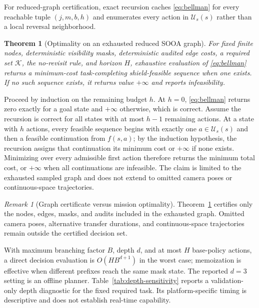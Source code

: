 \documentclass{IEEEtaes}
\newtheorem{theorem}{Theorem}
\theoremstyle{remark}
\newtheorem{remark}{Remark}
\theoremstyle{plain}
\begin{document}
For reduced-graph certification, exact recursion caches \eqref{eq:bellman} for every reachable tuple $(j,m,b,h)$ and enumerates every action in $\mathcal U_s(s)$ rather than a local reversal neighborhood.

\begin{theorem}[Optimality on an exhausted reduced SOOA graph]
\label{thm:reduced-optimality}
For fixed finite nodes, deterministic visibility masks, deterministic audited edge costs, a required set $\mathcal K$, the no-revisit rule, and horizon $H$, exhaustive evaluation of \eqref{eq:bellman} returns a minimum-cost task-completing shield-feasible sequence when one exists. If no such sequence exists, it returns value $+\infty$ and reports infeasibility.
\end{theorem}

\begin{IEEEproof}
Proceed by induction on the remaining budget $h$. At $h=0$, \eqref{eq:bellman} returns zero exactly for a goal state and $+\infty$ otherwise, which is correct. Assume the recursion is correct for all states with at most $h-1$ remaining actions. At a state with $h$ actions, every feasible sequence begins with exactly one $a\in\mathcal U_s(s)$ and then a feasible continuation from $f(s,a)$; by the induction hypothesis, the recursion assigns that continuation its minimum cost or $+\infty$ if none exists. Minimizing over every admissible first action therefore returns the minimum total cost, or $+\infty$ when all continuations are infeasible. The claim is limited to the exhausted sampled graph and does not extend to omitted camera poses or continuous-space trajectories.
\end{IEEEproof}

\begin{remark}[Graph certificate versus mission optimality]
Theorem~\ref{thm:reduced-optimality} certifies only the nodes, edges, masks, and audits included in the exhausted graph. Omitted camera poses, alternative transfer durations, and continuous-space trajectories remain outside the certified decision set.
\end{remark}

With maximum branching factor $B$, depth $d$, and at most $H$ base-policy actions, a direct decision evaluation is $O(HB^{d+1})$ in the worst case; memoization is effective when different prefixes reach the same mask state. The reported $d=3$ setting is an offline planner. Table~\ref{tab:depth-sensitivity} reports a validation-only depth diagnostic for the fixed required task. Its platform-specific timing is descriptive and does not establish real-time capability.
\end{document}
